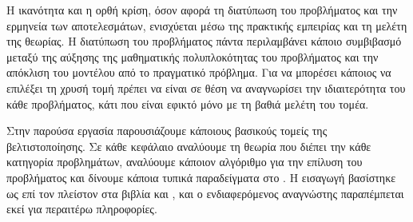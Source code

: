 Η ικανότητα και η ορθή κρίση, όσον αφορά τη διατύπωση του προβλήματος και την
ερμηνεία των αποτελεσμάτων, ενισχύεται μέσω της πρακτικής εμπειρίας και τη
μελέτη της θεωρίας. Η διατύπωση του προβλήματος πάντα περιλαμβάνει κάποιο
συμβιβασμό μεταξύ της αύξησης της μαθηματικής πολυπλοκότητας του προβλήματος και
την απόκλιση του μοντέλου από το πραγματικό πρόβλημα. Για να μπορέσει κάποιος να
επιλέξει τη χρυσή τομή πρέπει να είναι σε θέση να αναγνωρίσει την ιδιαιτερότητα
του κάθε προβλήματος, κάτι που είναι εφικτό μόνο με τη βαθιά μελέτη του τομέα.

Στην παρούσα εργασία παρουσιάζουμε κάποιους βασικούς τομείς της βελτιστοποίησης.
Σε κάθε κεφάλαιο αναλύουμε τη θεωρία που διέπει την κάθε κατηγορία προβλημάτων,
αναλύουμε κάποιον αλγόριθμο για την επίλυση του προβλήματος και δίνουμε κάποια
τυπικά παραδείγματα στο . Η εισαγωγή βασίστηκε ως επί τον πλείστον 
στα βιβλία \cite{bazaraa2013nonlinear} και \cite{luenberger2008linear}, και ο
ενδιαφερόμενος αναγνώστης παραπέμπεται εκεί για περαιτέρω πληροφορίες.

